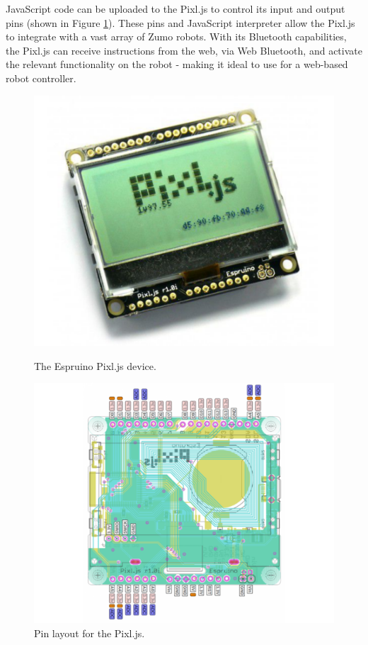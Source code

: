 \documentclass{l4proj}
\begin{document}
JavaScript code can be uploaded to the Pixl.js to control its input and output pins (shown in Figure \ref{fig:pixljs-pinout}). These pins and JavaScript interpreter allow the Pixl.js to integrate with a vast array of Zumo robots. With its Bluetooth capabilities, the Pixl.js can receive instructions from the web, via Web Bluetooth, and activate the relevant functionality on the robot - making it ideal to use for a web-based robot controller.

\begin{figure}[h!]
    \centering
    \begin{minipage}[b]{0.43\textwidth}
        \includegraphics[width=\textwidth]{images/pixljs.pdf}
        \caption{The Espruino Pixl.js device.}
        \label{fig:pixljs}
    \end{minipage}
    \begin{minipage}[b]{0.50\textwidth}
        \includegraphics[width=\textwidth]{images/pixljs-pinout.pdf}
        \caption{Pin layout for the Pixl.js.}
        \label{fig:pixljs-pinout}
    \end{minipage}
\end{figure}
\end{document}
